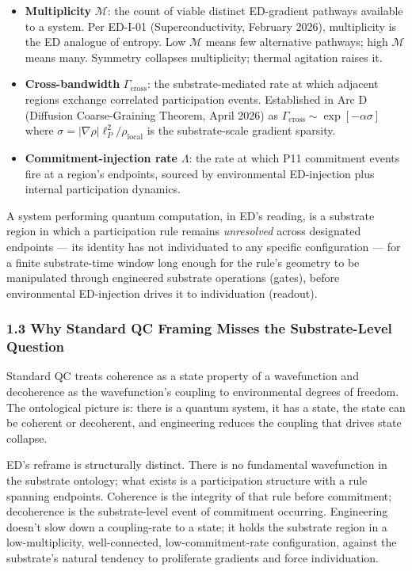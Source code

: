 \documentclass[
  11pt,
  a4paper,
]{article}
\begin{document}
\begin{itemize}
\item
  \textbf{Multiplicity} \(\mathcal{M}\): the count of viable distinct
  ED-gradient pathways available to a system. Per ED-I-01
  (Superconductivity, February 2026), multiplicity is the ED analogue of
  entropy. Low \(\mathcal{M}\) means few alternative pathways; high
  \(\mathcal{M}\) means many. Symmetry collapses multiplicity; thermal
  agitation raises it.
\item
  \textbf{Cross-bandwidth} \(\Gamma_{\mathrm{cross}}\): the
  substrate-mediated rate at which adjacent regions exchange correlated
  participation events. Established in Arc D (Diffusion Coarse-Graining
  Theorem, April 2026) as
  \(\Gamma_{\mathrm{cross}} \sim \exp[-\alpha\sigma]\) where
  \(\sigma = |\nabla\rho|\ell_P^2/\rho_{\mathrm{local}}\) is the
  substrate-scale gradient sparsity.
\item
  \textbf{Commitment-injection rate} \(\Lambda\): the rate at which P11
  commitment events fire at a region's endpoints, sourced by
  environmental ED-injection plus internal participation dynamics.
\end{itemize}

A system performing quantum computation, in ED's reading, is a substrate
region in which a participation rule remains \emph{unresolved} across
designated endpoints --- its identity has not individuated to any
specific configuration --- for a finite substrate-time window long
enough for the rule's geometry to be manipulated through engineered
substrate operations (gates), before environmental ED-injection drives
it to individuation (readout).

\subsubsection{1.3 Why Standard QC Framing Misses the Substrate-Level
Question}\label{why-standard-qc-framing-misses-the-substrate-level-question}

Standard QC treats coherence as a state property of a wavefunction and
decoherence as the wavefunction's coupling to environmental degrees of
freedom. The ontological picture is: there is a quantum system, it has a
state, the state can be coherent or decoherent, and engineering reduces
the coupling that drives state collapse.

ED's reframe is structurally distinct. There is no fundamental
wavefunction in the substrate ontology; what exists is a participation
structure with a rule spanning endpoints. Coherence is the integrity of
that rule before commitment; decoherence is the substrate-level event of
commitment occurring. Engineering doesn't slow down a coupling-rate to a
state; it holds the substrate region in a low-multiplicity,
well-connected, low-commitment-rate configuration, against the
substrate's natural tendency to proliferate gradients and force
individuation.
\end{document}
